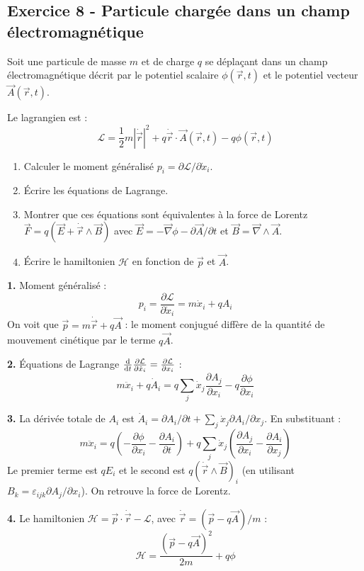 \documentclass[12pt,a4paper]{article}
\begin{document}
\subsection*{Exercice 8 - Particule chargée dans un champ électromagnétique \niveau{\difficile}}

\begin{boiteexercice}
Soit une particule de masse $m$ et de charge $q$ se déplaçant dans un champ électromagnétique décrit par le potentiel scalaire $\phi(\vec{r},t)$ et le potentiel vecteur $\vec{A}(\vec{r},t)$.

Le lagrangien est :
\[
\mathcal{L} = \frac{1}{2}m|\dot{\vec{r}}|^2 + q\dot{\vec{r}}\cdot\vec{A}(\vec{r},t) - q\phi(\vec{r},t)
\]
\begin{enumerate}
  \item Calculer le moment généralisé $p_i = \partial\mathcal{L}/\partial\dot x_i$.
  \item Écrire les équations de Lagrange.
  \item Montrer que ces équations sont équivalentes à la force de Lorentz $\vec{F} = q(\vec{E}+\dot{\vec{r}}\wedge\vec{B})$ avec $\vec{E} = -\vec{\nabla}\phi - \partial\vec{A}/\partial t$ et $\vec{B} = \vec{\nabla}\wedge\vec{A}$.
  \item Écrire le hamiltonien $\mathcal{H}$ en fonction de $\vec{p}$ et $\vec{A}$.
\end{enumerate}
\end{boiteexercice}

\begin{boitecorrige}
\textbf{1.} Moment généralisé :
\[
p_i = \frac{\partial\mathcal{L}}{\partial\dot x_i} = m\dot x_i + qA_i
\]
On voit que $\vec{p} = m\dot{\vec{r}} + q\vec{A}$ : le moment conjugué diffère de la quantité de mouvement cinétique par le terme $q\vec{A}$.

\textbf{2.} Équations de Lagrange $\frac{\mathrm{d}}{\mathrm{d} t}\frac{\partial\mathcal{L}}{\partial\dot x_i} = \frac{\partial\mathcal{L}}{\partial x_i}$ :
\[
m\ddot x_i + q\dot A_i = q\sum_j\dot x_j\frac{\partial A_j}{\partial x_i} - q\frac{\partial\phi}{\partial x_i}
\]

\textbf{3.} La dérivée totale de $A_i$ est $\dot A_i = \partial A_i/\partial t + \sum_j\dot x_j\partial A_i/\partial x_j$. En substituant :
\[
m\ddot x_i = q\left(-\frac{\partial\phi}{\partial x_i} - \frac{\partial A_i}{\partial t}\right) + q\sum_j\dot x_j\left(\frac{\partial A_j}{\partial x_i} - \frac{\partial A_i}{\partial x_j}\right)
\]
Le premier terme est $qE_i$ et le second est $q(\dot{\vec{r}}\wedge\vec{B})_i$ (en utilisant $B_k = \varepsilon_{ijk}\partial A_j/\partial x_i$). On retrouve la force de Lorentz.

\textbf{4.} Le hamiltonien $\mathcal{H} = \vec{p}\cdot\dot{\vec{r}} - \mathcal{L}$, avec $\dot{\vec{r}} = (\vec{p}-q\vec{A})/m$ :
\[
\mathcal{H} = \frac{(\vec{p}-q\vec{A})^2}{2m} + q\phi
\]
\end{boitecorrige}
\end{document}
